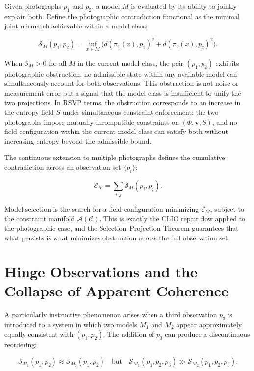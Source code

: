 \documentclass[12pt, a4paper, oneside]{article}
\theoremstyle{plain}
\theoremstyle{definition}
\theoremstyle{remark}
\newcommand{\C}{\mathcal{C}}
\newcommand{\A}{\mathcal{A}}
\newcommand{\proj}{\pi}
\begin{document}
Given photographs $p_1$ and $p_2$, a model $M$ is evaluated by its ability to jointly explain both. Define the photographic contradiction functional as the minimal joint mismatch achievable within a model class:

\begin{equation}
\mathcal{S}_M(p_1, p_2) = \inf_{x \in M} \Big( d(\proj_1(x), p_1)^2 + d(\proj_2(x), p_2)^2 \Big).
\end{equation}

When $\mathcal{S}_M > 0$ for all $M$ in the current model class, the pair $(p_1, p_2)$ exhibits photographic obstruction: no admissible state within any available model can simultaneously account for both observations. This obstruction is not noise or measurement error but a signal that the model class is insufficient to unify the two projections. In RSVP terms, the obstruction corresponds to an increase in the entropy field $S$ under simultaneous constraint enforcement: the two photographs impose mutually incompatible constraints on $(\Phi, \mathbf{v}, S)$, and no field configuration within the current model class can satisfy both without increasing entropy beyond the admissible bound.

The continuous extension to multiple photographs defines the cumulative contradiction across an observation set $\{p_i\}$:

\begin{equation}
\mathcal{E}_M = \sum_{i,j} \mathcal{S}_M(p_i, p_j).
\end{equation}

Model selection is the search for a field configuration minimizing $\mathcal{E}_M$, subject to the constraint manifold $\A(\C)$. This is exactly the CLIO repair flow applied to the photographic case, and the Selection--Projection Theorem guarantees that what persists is what minimizes obstruction across the full observation set.

\section{Hinge Observations and the Collapse of Apparent Coherence}

A particularly instructive phenomenon arises when a third observation $p_3$ is introduced to a system in which two models $M_1$ and $M_2$ appear approximately equally consistent with $(p_1, p_2)$. The addition of $p_3$ can produce a discontinuous reordering:

\begin{equation}
\mathcal{S}_{M_1}(p_1, p_2) \approx \mathcal{S}_{M_2}(p_1, p_2) \quad \text{but} \quad \mathcal{S}_{M_1}(p_1, p_2, p_3) \gg \mathcal{S}_{M_2}(p_1, p_2, p_3).
\end{equation}
\end{document}
